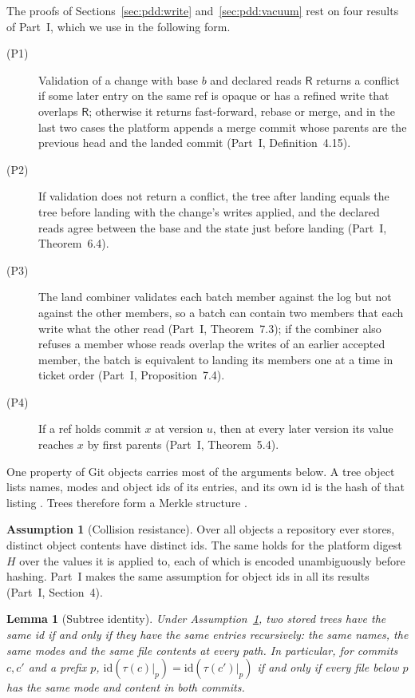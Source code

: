 \documentclass[11pt,letterpaper]{article}
\newtheorem{lemma}[theorem]{Lemma}
\theoremstyle{definition}
\newtheorem{assumption}[theorem]{Assumption}
\theoremstyle{remark}
\newcommand{\id}{\mathrm{id}}
\newcommand{\tree}{\tau}
\newcommand{\R}{\mathsf{R}}
\begin{document}
The proofs of Sections~\ref{sec:pdd:write} and~\ref{sec:pdd:vacuum} rest on four results of Part~I, which we use in the following form.
\begin{description}
\item[\normalfont (P1)] Validation of a change with base $b$ and declared reads $\R$ returns a conflict if some later entry on the same ref is opaque or has a refined write that overlaps $\R$; otherwise it returns fast-forward, rebase or merge, and in the last two cases the platform appends a merge commit whose parents are the previous head and the landed commit (Part~I, Definition~4.15).
\item[\normalfont (P2)] If validation does not return a conflict, the tree after landing equals the tree before landing with the change's writes applied, and the declared reads agree between the base and the state just before landing (Part~I, Theorem~6.4).
\item[\normalfont (P3)] The land combiner validates each batch member against the log but not against the other members, so a batch can contain two members that each write what the other read (Part~I, Theorem~7.3); if the combiner also refuses a member whose reads overlap the writes of an earlier accepted member, the batch is equivalent to landing its members one at a time in ticket order (Part~I, Proposition~7.4).
\item[\normalfont (P4)] If a ref holds commit $x$ at version $u$, then at every later version its value reaches $x$ by first parents (Part~I, Theorem~5.4).
\end{description}

One property of Git objects carries most of the arguments below. A tree object lists names, modes and object ids of its entries, and its own id is the hash of that listing \cite{gitobjects}. Trees therefore form a Merkle structure \cite{merkle1988}.

\begin{assumption}[Collision resistance]
\label{as:pdd:collision}
Over all objects a repository ever stores, distinct object contents have distinct ids. The same holds for the platform digest $H$ over the values it is applied to, each of which is encoded unambiguously before hashing. Part~I makes the same assumption for object ids in all its results (Part~I, Section~4).
\end{assumption}

\begin{lemma}[Subtree identity]
\label{lem:pdd:merkle}
Under Assumption~\ref{as:pdd:collision}, two stored trees have the same id if and only if they have the same entries recursively: the same names, the same modes and the same file contents at every path. In particular, for commits $c,c'$ and a prefix $p$, $\id(\tree(c)|_p)=\id(\tree(c')|_p)$ if and only if every file below $p$ has the same mode and content in both commits.
\end{lemma}
\end{document}
